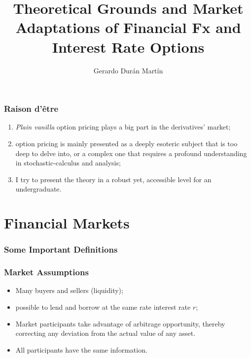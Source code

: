 \documentclass{beamer}
\title{Theoretical Grounds and Market Adaptations of Financial Fx and Interest Rate Options}
\author{Gerardo Dur\'an Mart\'in}
\institute{Universidad Marista}
\begin{document}
\frame{\titlepage}

\begin{frame}
	\frametitle{Raison d'\^etre}
	\begin{enumerate}
		\item<1-> \textit{Plain vanilla} option pricing plays a big part in the derivatives' market;
		\item<2-> option pricing is mainly presented as a deeply esoteric subject that is too deep to delve into, or a complex one that requires a profound understanding in stochastic-calculus and analysis;
		\item<3-> I try to present the theory in a robust yet, accessible level for an undergraduate.
	\end{enumerate}
\end{frame}

\section{Financial Markets}

\begin{frame}
\frametitle{Some Important Definitions}



\end{frame}


\begin{frame}
\frametitle{Market Assumptions}
\begin{itemize}
	\item Many buyers and sellers (liquidity);
	\item possible to lend and borrow at the same rate interest rate $r$;
	\item Market participants take advantage of arbitrage opportunity, thereby correcting any deviation from the actual value of any asset.
	\item All participants have the same information.
\end{itemize}
\end{frame}
\end{document}
